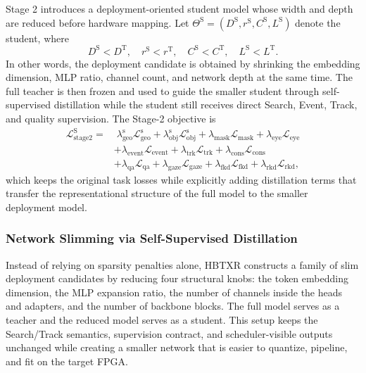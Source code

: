 \documentclass[journal]{IEEEtran}
\begin{document}
Stage 2 introduces a deployment-oriented student model whose width and depth are reduced before hardware mapping. Let $\Theta^{\mathrm{S}}=(D^{\mathrm{S}}, r^{\mathrm{S}}, C^{\mathrm{S}}, L^{\mathrm{S}})$ denote the student, where
\begin{equation}
D^{\mathrm{S}}<D^{\mathrm{T}},\quad
r^{\mathrm{S}}<r^{\mathrm{T}},\quad
C^{\mathrm{S}}<C^{\mathrm{T}},\quad
L^{\mathrm{S}}<L^{\mathrm{T}}.
\end{equation}
In other words, the deployment candidate is obtained by shrinking the embedding dimension, MLP ratio, channel count, and network depth at the same time. The full teacher is then frozen and used to guide the smaller student through self-supervised distillation while the student still receives direct Search, Event, Track, and quality supervision. The Stage-2 objective is
\begin{align}
\mathcal L_{\mathrm{stage2}}^{\mathrm{S}} =
&\;\lambda_{\mathrm{geo}}^{\mathrm{s}}\mathcal L_{\mathrm{geo}}^{\mathrm{s}}
+ \lambda_{\mathrm{obj}}^{\mathrm{s}}\mathcal L_{\mathrm{obj}}^{\mathrm{s}}
+ \lambda_{\mathrm{mask}}\mathcal L_{\mathrm{mask}}
+ \lambda_{\mathrm{eye}}\mathcal L_{\mathrm{eye}}
\nonumber\\
&+ \lambda_{\mathrm{event}}\mathcal L_{\mathrm{event}}
+ \lambda_{\mathrm{trk}}\mathcal L_{\mathrm{trk}}
+ \lambda_{\mathrm{cons}}\mathcal L_{\mathrm{cons}}
\nonumber\\
&+ \lambda_{\mathrm{qa}}\mathcal L_{\mathrm{qa}}
+ \lambda_{\mathrm{gaze}}\mathcal L_{\mathrm{gaze}}
+ \lambda_{\mathrm{fkd}}\mathcal L_{\mathrm{fkd}}
+ \lambda_{\mathrm{rkd}}\mathcal L_{\mathrm{rkd}},
\end{align}
which keeps the original task losses while explicitly adding distillation terms that transfer the representational structure of the full model to the smaller deployment model.

\subsubsection{Network Slimming via Self-Supervised Distillation}
Instead of relying on sparsity penalties alone, HBTXR constructs a family of slim deployment candidates by reducing four structural knobs: the token embedding dimension, the MLP expansion ratio, the number of channels inside the heads and adapters, and the number of backbone blocks. The full model serves as a teacher and the reduced model serves as a student. This setup keeps the Search/Track semantics, supervision contract, and scheduler-visible outputs unchanged while creating a smaller network that is easier to quantize, pipeline, and fit on the target FPGA.
\end{document}
